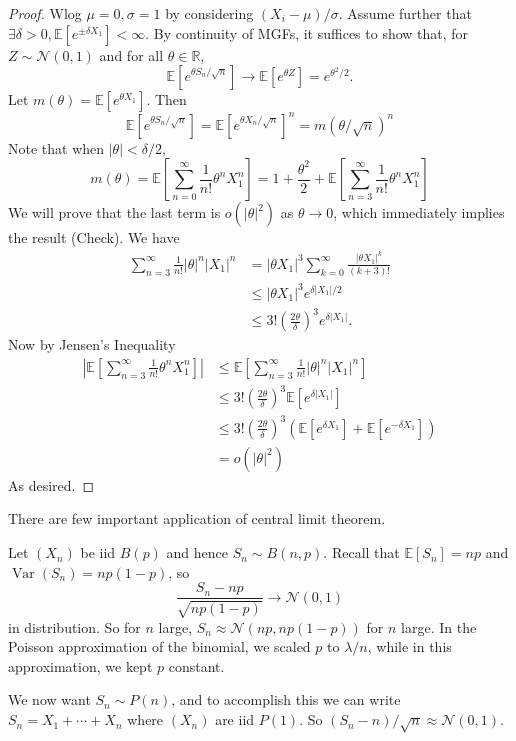 \begin{proof}
    Wlog $\mu=0,\sigma=1$ by considering $(X_i-\mu)/\sigma$.
    Assume further that $\exists\delta>0,\mathbb E[e^{\pm\delta X_1}]<\infty$.
    By continuity of MGFs, it suffices to show that, for $Z\sim\mathcal N(0,1)$ and for all $ \theta\in \mathbb{R} $,
    $$\mathbb E[e^{\theta S_n/\sqrt{n}}]\to\mathbb E[e^{\theta Z}]=e^{\theta^2/2}.$$
    Let $ m(\theta)=\mathbb{E}[e^{\theta X_1}] $. Then 
    $$\mathbb E[e^{\theta S_n/\sqrt{n}}]=\mathbb E[e^{\theta X_n/\sqrt{n}}]^n=m(\theta/\sqrt{n})^n$$
    Note that when $|\theta|<\delta/2$,
    $$m(\theta)=\mathbb E\left[ \sum_{n=0}^\infty\frac{1}{n!}\theta^nX_1^n \right]=1+\frac{\theta^2}{2}+\mathbb E\left[  \sum_{n=3}^\infty\frac{1}{n!}\theta^nX_1^n \right]$$
    We will prove that the last term is $o(|\theta|^2)$ as $\theta\to 0$, which immediately implies the result (Check). We have
    \begin{align*}
        \sum_{n=3}^\infty\frac{1}{n!}|\theta|^n|X_1|^n&=|\theta X_1|^3\sum_{k=0}^\infty\frac{|\theta X_1|^k}{(k+3)!}\\
        &\le|\theta X_1|^3e^{\delta|X_1|/2}\\
        &\le 3!\left( \frac{2\theta}{\delta} \right)^3e^{\delta|X_1|}.
    \end{align*}
    Now by Jensen's Inequality
    \begin{align*}
        \left|\mathbb E\left[  \sum_{n=3}^\infty\frac{1}{n!}\theta^nX_1^n \right]\right|&\le\mathbb E\left[ \sum_{n=3}^\infty\frac{1}{n!}|\theta|^n|X_1|^n \right]\\
        &\le 3!\left( \frac{2\theta}{\delta} \right)^3\mathbb E[e^{\delta|X_1|}]\\
        &\le 3!\left( \frac{2\theta}{\delta} \right)^3(\mathbb E[e^{\delta X_1}]+\mathbb E[e^{-\delta X_1}])\\
        &=o(|\theta|^2)
    \end{align*}
    As desired.
\end{proof}
There are few important application of central limit theorem.
\begin{example}
    Let $(X_n)$ be iid $B(p)$ and hence $S_n\sim B(n,p)$.
    Recall that $\mathbb E[S_n]=np$ and $\operatorname{Var}(S_n)=np(1-p)$, so
    $$\frac{S_n-np}{\sqrt{np(1-p)}}\to\mathcal N(0,1)$$
    in distribution.
    So for $n$ large, $S_n\approx\mathcal N(np,np(1-p))$ for $n$ large.
    In the Poisson approximation of the binomial, we scaled $p$ to $\lambda/n$, while in this approximation, we kept $p$ constant.
\end{example}
\begin{example}
    We now want $S_n\sim P(n)$, and to accomplish this we can write $S_n=X_1+\cdots+X_n$ where $(X_n)$ are iid $P(1)$.
    So $(S_n-n)/\sqrt{n}\approx \mathcal N(0,1)$.
\end{example}

